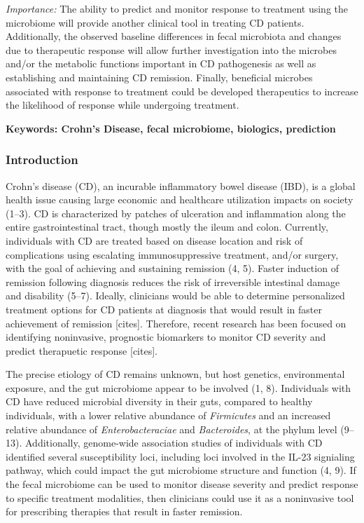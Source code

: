 \documentclass[11pt,]{article}
\begin{document}
\emph{Importance:} The ability to predict and monitor response to
treatment using the microbiome will provide another clinical tool in
treating CD patients. Additionally, the observed baseline differences in
fecal microbiota and changes due to therapeutic response will allow
further investigation into the microbes and/or the metabolic functions
important in CD pathogenesis as well as establishing and maintaining CD
remission. Finally, beneficial microbes associated with response to
treatment could be developed therapeutics to increase the likelihood of
response while undergoing treatment.

\textbf{Keywords: Crohn's Disease, fecal microbiome, biologics,
prediction}

\newpage

\subsubsection{Introduction}\label{introduction}

Crohn's disease (CD), an incurable inflammatory bowel disease (IBD), is
a global health issue causing large economic and healthcare utilization
impacts on society (1--3). CD is characterized by patches of ulceration
and inflammation along the entire gastrointestinal tract, though mostly
the ileum and colon. Currently, individuals with CD are treated based on
disease location and risk of complications using escalating
immunosuppressive treatment, and/or surgery, with the goal of achieving
and sustaining remission (4, 5). Faster induction of remission following
diagnosis reduces the risk of irreversible intestinal damage and
disability (5--7). Ideally, clinicians would be able to determine
personalized treatment options for CD patients at diagnosis that would
result in faster achievement of remission {[}cites{]}. Therefore, recent
research has been focused on identifying noninvasive, prognostic
biomarkers to monitor CD severity and predict therapuetic response
{[}cites{]}.

The precise etiology of CD remains unknown, but host genetics,
environmental exposure, and the gut microbiome appear to be involved (1,
8). Individuals with CD have reduced microbial diversity in their guts,
compared to healthy individuals, with a lower relative abundance of
\emph{Firmicutes} and an increased relative abundance of
\emph{Enterobacteraciae} and \emph{Bacteroides}, at the phylum level
(9--13). Additionally, genome-wide association studies of individuals
with CD identified several susceptibility loci, including loci involved
in the IL-23 signialing pathway, which could impact the gut microbiome
structure and function (4, 9). If the fecal microbiome can be used to
monitor disease severity and predict response to specific treatment
modalities, then clinicians could use it as a noninvasive tool for
prescribing therapies that result in faster remission.
\end{document}
